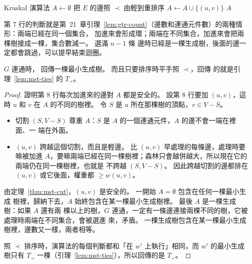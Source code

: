 \begin{pseudo}[label=alg:mst-kruskal]{Kruskal 演算法}
    \State $A \gets \emptyset$
        \State {}
    \EndFor
    \State 把 $E$ 的邊照 $\prec$ 由輕到重排序 
            \State $A \gets A \cup \{(u, v)\}$
            \State {}
        \EndIf
    \EndFor
    \State \Return $A$
\EndProcedure
\end{pseudo}

第 7 行的判斷就是第~21~章引理~\ref{lem:gtr-count}（邊數和連通元件數）的兩種情形：兩端已經在同一個集合，
加進來會形成環；兩端在不同集合，加進來會把兩棵樹接成一棵，集合數減一。 選滿 $n - 1$ 條
邊時已經是一棵生成樹，後面的邊一定都會跳過，可以提早結束迴圈。

\begin{theorem}
\label{thm:mst-kruskal}
$G$ 連通時， 回傳一棵最小生成樹。 而且只要排序時平手照 $\prec$，回傳
的就是引理~\ref{lem:mst-ties} 的 $T_{\prec}$。
\end{theorem}

\begin{proof}
證明第 8 行每次加進來的邊對 $A$ 都是安全的。 設第 8 行要加 $(u, v)$，這時 $u$ 和 $v$ 在 $A$
的不同的樹裡。 令 $S$ 是 $u$ 所在那棵樹的頂點，$v \in V - S$。

\begin{itemize}
\item 切割 $(S, V - S)$ 尊重 $A$：$S$ 是 $A$ 的一個連通元件，$A$ 的邊不會一端在裡面、一
端在外面。
\item $(u, v)$ 跨越這個切割，而且是輕邊。 比 $(u, v)$ 早處理的每條邊，處理時要嘛被加進
$A$，要嘛兩端已經在同一棵樹裡；森林只會越併越大，所以現在它的兩端仍在同一棵樹裡，也就是
不跨越 $(S, V - S)$。 因此跨越切割的邊都排在 $(u, v)$ 或它後面，權重都 $\ge w(u, v)$。
\end{itemize}

由定理~\ref{thm:mst-cut}，$(u, v)$ 是安全的。 一開始 $A = \emptyset$ 包含在任何一棵最小生成
樹裡，歸納下去，$A$ 始終包含在某一棵最小生成樹裡。 最後 $A$ 是一棵生成樹：如果 $A$ 還有兩
棵以上的樹，$G$ 連通，一定有一條邊連接兩棵不同的樹，它被處理時兩端在不同集合，會被選進
來，矛盾。 一棵生成樹包含在某一棵最小生成樹裡，邊數又一樣，兩者相等。

照 $\prec$ 排序時，演算法的每個判斷都和「在 $w'$ 上執行」相同，而 $w'$ 的最小生成樹只有
$T_{\prec}$ 一棵（引理~\ref{lem:mst-ties}），所以回傳的是 $T_{\prec}$。
\end{proof}

